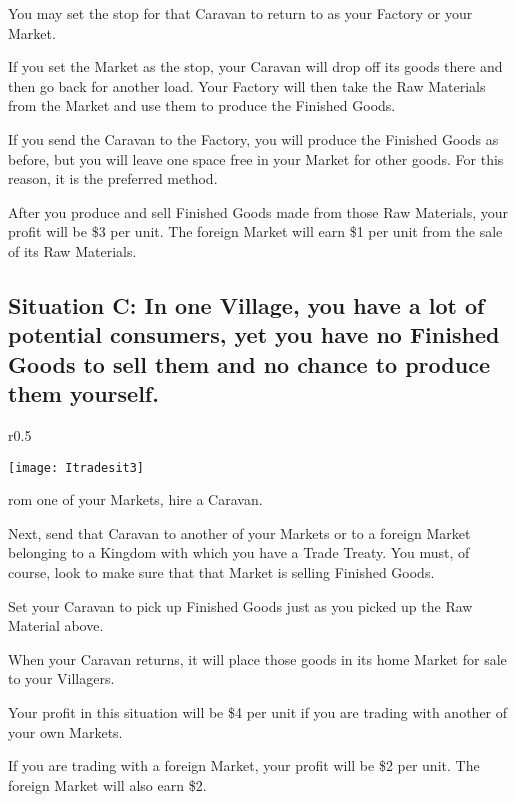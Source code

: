 You may set the stop for that Caravan to return to as your Factory or your Market.

If you set the Market as the stop, your Caravan will drop off its goods there and then go back for another load. Your Factory will then take the Raw Materials from the Market and use them to produce the Finished Goods.

If you send the Caravan to the Factory, you will produce the Finished Goods as before, but you will leave one space free in your Market for other goods. For this reason, it is the preferred method.

After you produce and sell Finished Goods made from those Raw Materials, your profit will be \$3 per unit. The foreign Market will earn \$1 per unit from the sale of its Raw Materials.

\subsection{\textsf{Situation C: In one Village, you have a lot of potential consumers, yet you have no Finished Goods to sell them and no chance to produce them yourself.}}

\begin{wrapfigure}{r}{0.5\textwidth}
    \vspace{-20pt}
    \begin{center}
        \texttt{[image: Itradesit3]} %
    \end{center}
    \vspace{-20pt}
\end{wrapfigure}

rom one of your Markets, hire a Caravan.

Next, send that Caravan to another of your Markets or to a foreign Market belonging to a Kingdom with which you have a Trade Treaty. You must, of course, look to make sure that that Market is selling Finished Goods.

Set your Caravan to pick up Finished Goods just as you picked up the Raw Material above.

When your Caravan returns, it will place those goods in its home Market for sale to your Villagers.

Your profit in this situation will be \$4 per unit if you are trading with another of your own Markets.

If you are trading with a foreign Market, your profit will be \$2 per unit. The foreign Market will also earn \$2.

